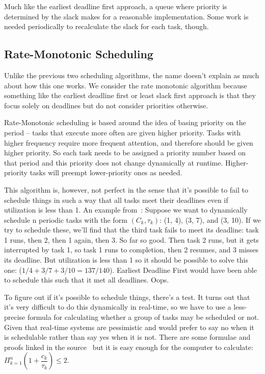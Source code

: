 Much like the earliest deadline first approach, a queue where priority is determined by the slack makes for a reasonable implementation. Some work is needed periodically to recalculate the slack for each task, though. 

\subsection*{Rate-Monotonic Scheduling}

Unlike the previous two scheduling algorithms, the name doesn't explain as much about how this one works. We consider the rate monotonic algorithm because something like the earliest deadline first or least slack first approach is that they focus solely on deadlines but do not consider priorities otherwise. 

Rate-Monotonic scheduling is based around the idea of basing priority on the period -- tasks that execute more often are given higher priority. Tasks with higher frequency require more frequent attention, and therefore should be given higher priority. So each task needs to be assigned a priority number based on that period and this priority does not change dynamically at runtime. Higher-priority tasks will preempt lower-priority ones as needed.

This algorithm is, however, not perfect in the sense that it's possible to fail to schedule things in such a way that all tasks meet their deadlines even if utilization is less than 1. An example from~\cite{mte241}: Suppose we want to dynamically schedule n periodic tasks with the form $(C_{k}, \tau _{k})$: (1, 4), (3, 7), and (3, 10). If we try to schedule these, we'll find that the third task fails to meet its deadline: task 1 runs, then 2, then 1 again, then 3. So far so good. Then task 2 runs, but it gets interrupted by task 1, so task 1 runs to completion, then 2 resumes, and 3 misses its deadline. But utilization is less than 1 so it should be possible to solve this one: ($1/4 + 3/7 + 3/10 = 137/140$). Earliest Deadline First would have been able to schedule this such that it met all deadlines. Oops.

To figure out if it's possible to schedule things, there's a test. It turns out that it's very difficult to do this dynamically in real-time, so we have to use a less-precise formula for calculating whether a group of tasks may be scheduled or not. Given that real-time systems are pessimistic and would prefer to say no when it is schedulable rather than say yes when it is not. There are some formulae and proofs linked in the source~\cite{mte241} but it is easy enough for the computer to calculate: $\Pi^{n}_{k=1}( 1 + \dfrac{c_k}{\tau _k}) \leq 2$.

